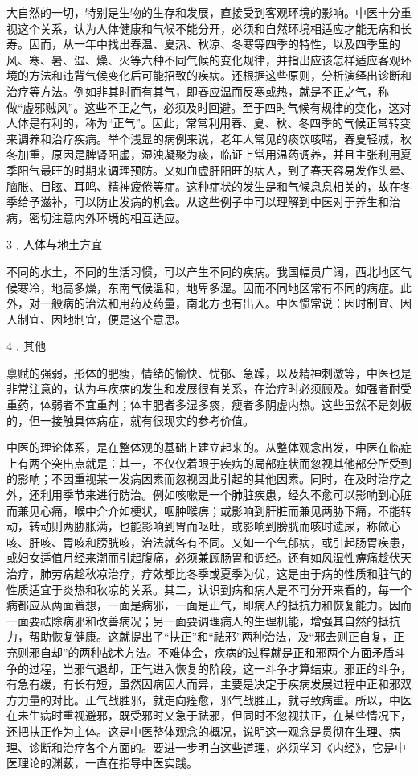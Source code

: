 \documentclass[a4paper,12pt,UTF8,twoside]{ctexbook}
\begin{document}
大自然的一切，特别是生物的生存和发展，直接受到客观环境的影响。中医十分重视这个关系，认为人体健康和气候不能分开，必须和自然环境相适应才能无病和长寿。因而，从一年中找出春温、夏热、秋凉、冬寒等四季的特性，以及四季里的风、寒、暑、湿、燥、火等六种不同气候的变化规律，并指出应该怎样适应客观环境的方法和违背气候变化后可能招致的疾病。还根据这些原则，分析演绎出诊断和治疗等方法。例如非其时而有其气，即春应温而反寒或热，就是不正之气，称做“虚邪贼风”。这些不正之气，必须及时回避。至于四时气候有规律的变化，这对人体是有利的，称为“正气”。因此，常常利用春、夏、秋、冬四季的气候正常转变来调养和治疗疾病。举个浅显的病例来说，老年人常见的痰饮咳喘，春夏轻减，秋冬加重，原因是脾肾阳虚，湿浊凝聚为痰，临证上常用温药调养，并且主张利用夏季阳气最旺的时期来调理预防。又如血虚肝阳旺的病人，到了春天容易发作头晕、脑胀、目眩、耳鸣、精神疲倦等症。这种症状的发生是和气候息息相关的，故在冬季给予滋补，可以防止发病的机会。从这些例子中可以理解到中医对于养生和治病，密切注意内外环境的相互适应。

3﹒人体与地土方宜

不同的水土，不同的生活习惯，可以产生不同的疾病。我国幅员广阔，西北地区气候寒冷，地高多燥，东南气候温和，地卑多湿。因而不同地区常有不同的病症。此外，对一般病的治法和用药及药量，南北方也有出入。中医惯常说：因时制宜、因人制宜、因地制宜，便是这个意思。

4﹒其他

禀赋的强弱，形体的肥瘦，情绪的愉快、忧郁、急躁，以及精神刺激等，中医也是非常注意的，认为与疾病的发生和发展很有关系，在治疗时必须顾及。如强者耐受重药，体弱者不宜重剂；体丰肥者多湿多痰，瘦者多阴虚内热。这些虽然不是刻板的，但一接触具体病症，就有很现实的参考价值。

中医的理论体系，是在整体观的基础上建立起来的。从整体观念出发，中医在临症上有两个突出点就是：其一，不仅仅着眼于疾病的局部症状而忽视其他部分所受到的影响；不因重视某一发病因素而忽视因此引起的其他因素。同时，在及时治疗之外，还利用季节来进行防治。例如咳嗽是一个肺脏疾患，经久不愈可以影响到心脏而兼见心痛，喉中介介如梗状，咽肿喉痹；或影响到肝脏而兼见两胁下痛，不能转动，转动则两胁胀满，也能影响到胃而呕吐，或影响到膀胱而咳时遗尿，称做心咳、肝咳、胃咳和膀胱咳，治法就各有不同。又如一个气郁病，或引起肠胃疾患，或妇女适值月经来潮而引起腹痛，必须兼顾肠胃和调经。还有如风湿性痹痛趁伏天治疗，肺劳病趁秋凉治疗，疗效都比冬季或夏季为优，这是由于病的性质和脏气的性质适宜于炎热和秋凉的关系。其二，认识到病和病人是不可分开来看的，每一个病都应从两面着想，一面是病邪，一面是正气，即病人的抵抗力和恢复能力。因而一面要祛除病邪和改善病况；另一面要调理病人的生理机能，增强其自然的抵抗力，帮助恢复健康。这就提出了“扶正”和“祛邪”两种治法，及“邪去则正自复，正充则邪自却”的两种战术方法。不难体会，疾病的过程就是正和邪两个方面矛盾斗争的过程，当邪气退却，正气进入恢复的阶段，这一斗争才算结束。邪正的斗争，有急有缓，有长有短，虽然因病因人而异，主要是决定于疾病发展过程中正和邪双方力量的对比。正气战胜邪，就走向痊愈，邪气战胜正，就导致病重。所以，中医在未生病时重视避邪，既受邪时又急于祛邪，但同时不忽视扶正，在某些情况下，还把扶正作为主体。这是中医整体观念的概况，说明这一观念是贯彻在生理、病理、诊断和治疗各个方面的。要进一步明白这些道理，必须学习《内经》，它是中医理论的渊薮，一直在指导中医实践。
\end{document}
